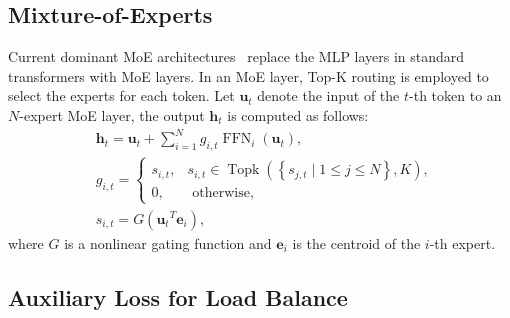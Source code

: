\documentclass{article}
\begin{document}
\subsection{Mixture-of-Experts} Current dominant MoE architectures~\citep{Lepikhin2020GShardSG,Fedus2021SwitchTS,Dai2024DeepSeekMoETU} replace the MLP layers in standard transformers with MoE layers. In an MoE layer, Top-K routing is employed to select the experts for each token. Let $\mathbf{u}_t$ denote the input of the $t$-th token to an $N$-expert MoE layer, the output $\mathbf{h}_t$ is computed as follows:
\begin{equation}
\begin{aligned}
& \mathbf{h}_t=\mathbf{u}_t+\sum_{i=1}^{N} g_{i, t} \operatorname{FFN}_i\left(\mathbf{u}_t\right), \\
& g_{i, t}= \begin{cases}s_{i, t}, & s_{i, t} \in \operatorname{Topk}\left(\left\{s_{j, t} \mid 1 \leq j \leq N\right\}, K\right), \\
0, & \text { otherwise, }\end{cases} \\
& s_{i, t}=G\left(\mathbf{u}_t{ }^T \mathbf{e}_i\right),
\end{aligned} 
\end{equation}
where $G$ is a nonlinear gating function and $ \mathbf{e}_i$ is the centroid of the $i$-th expert.

\subsection{Auxiliary Loss for Load Balance}
\label{sec:aux_loss}
\end{document}
